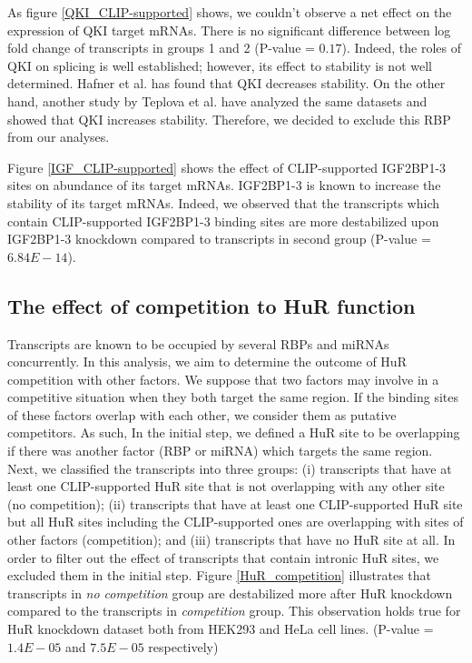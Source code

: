 As figure \ref{QKI_CLIP-supported} shows, we couldn't observe a net effect on the expression of QKI target mRNAs. There is no significant difference between log fold change of transcripts in groups 1 and 2 (P-value = $0.17$). Indeed, the roles of QKI on splicing is well established; however, its effect to stability is not well determined. Hafner et al. \cite{hafner_10} has found that QKI decreases stability. On the other hand, another study by Teplova et al. \cite{teplova_2013} have analyzed the same datasets and showed that QKI increases stability. Therefore, we decided to exclude this RBP from our analyses.

Figure \ref{IGF_CLIP-supported} shows the effect of CLIP-supported IGF2BP1-3 sites on abundance of its target mRNAs. IGF2BP1-3 is known to increase the stability of its target mRNAs. Indeed, we observed that the transcripts which contain CLIP-supported IGF2BP1-3 binding sites are more destabilized upon IGF2BP1-3 knockdown compared to transcripts in second group (P-value = $6.84E-14$).

\subsection{The effect of competition to HuR function}

Transcripts are known to be occupied by several RBPs and miRNAs concurrently. In this analysis, we aim to determine the outcome of HuR competition with other factors. We suppose that two factors may involve in a competitive situation when they both target the same region. If the binding sites of these factors overlap with each other, we consider them as putative competitors. As such, In the initial step, we defined a HuR site to be overlapping if there was another factor (RBP or miRNA) which targets the same region. Next, we classified the transcripts into three groups: (i) transcripts that have at least one CLIP-supported HuR site that is not overlapping with any other site (no competition); (ii) transcripts that have at least one CLIP-supported HuR site but all HuR sites including the CLIP-supported ones are overlapping with sites of other factors (competition); and (iii) transcripts that have no HuR site at all. In order to filter out the effect of transcripts that contain intronic HuR sites, we excluded them in the initial step. Figure \ref{HuR_competition} illustrates that transcripts in \textit{no competition} group are destabilized more after HuR knockdown compared to the transcripts in \textit{competition} group. This observation holds true for HuR knockdown dataset both from HEK293 and HeLa cell lines. (P-value = $1.4E-05$ and $7.5E-05$ respectively)

